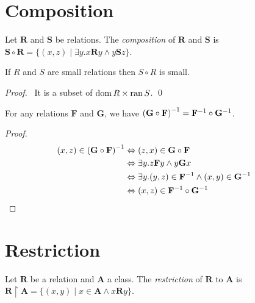 \section{Composition}

\begin{definition}[Composition]
    Let $\mathbf{R}$ and $\mathbf{S}$ be relations. 
    The \emph{composition} of $\mathbf{R}$ and $\mathbf{S}$ is
    $\mathbf{S} \circ \mathbf{R} = \{ (x,z) \mid \exists y. x \mathbf{R} y \wedge y \mathbf{S} z \}$.
\end{definition}

\begin{theorem}
    If $R$ and $S$ are small relations then $S \circ R$ is small.
\end{theorem}

\begin{proof}
    \pf\ It is a subset of $\operatorname{dom} R \times \operatorname{ran} S$. \qed
\end{proof}

\begin{theorem}
    For any relations $\mathbf{F}$ and $\mathbf{G}$, we have
    ${(\mathbf{G} \circ \mathbf{F})}^{-1} = {\mathbf{F}}^{-1} \circ {\mathbf{G}}^{-1}$.
\end{theorem}

\begin{proof}
    \pf
    \begin{align*}
        (x,z) \in {(\mathbf{G} \circ \mathbf{F})}^{-1} & \Leftrightarrow (z,x) \in \mathbf{G} \circ \mathbf{F} \\
        & \Leftrightarrow \exists y. z\mathbf{F}y \wedge y\mathbf{G}x \\
        & \Leftrightarrow \exists y. (y,z) \in {\mathbf{F}}^{-1} \wedge (x,y) \in {\mathbf{G}}^{-1} \\
        & \Leftrightarrow (x,z) \in {\mathbf{F}}^{-1} \circ {\mathbf{G}}^{-1} & \relax
    \end{align*}
\end{proof}

\section{Restriction}

\begin{definition}[Restriction]
    Let $\mathbf{R}$ be a relation and $\mathbf{A}$ a class. 
    The \emph{restriction} of $\mathbf{R}$ to $\mathbf{A}$
    is $\mathbf{R} \restriction \mathbf{A} = 
    \{ (x,y) \mid x \in \mathbf{A} \wedge x\mathbf{R}y \}$.
\end{definition}

